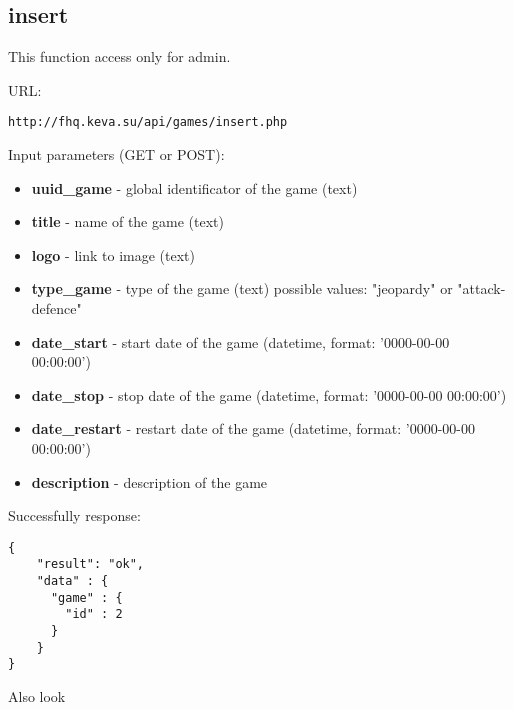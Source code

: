 \subsection{insert}
\par

This function access only for admin.

URL:
\begin{Verbatim}[frame=single]
http://fhq.keva.su/api/games/insert.php
\end{Verbatim}

Input parameters (GET or POST):
\begin{itemize}
  \item \textbf{uuid_game} - global identificator of the game (text)
  \item \textbf{title} - name of the game (text)
  \item \textbf{logo} - link to image (text)
  \item \textbf{type_game} - type of the game (text) possible values: "jeopardy" or "attack-defence"
  \item \textbf{date_start} - start date of the game (datetime, format:  '0000-00-00 00:00:00')
  \item \textbf{date_stop} - stop date of the game (datetime, format:  '0000-00-00 00:00:00')
  \item \textbf{date_restart} - restart date of the game (datetime, format:  '0000-00-00 00:00:00')
  \item \textbf{description} - description of the game
\end{itemize}

Successfully response:  \\
\begin{Verbatim}[frame=single]
{
    "result": "ok",
    "data" : {
      "game" : {
        "id" : 2
      }
    }
}
\end{Verbatim}

Also look ~